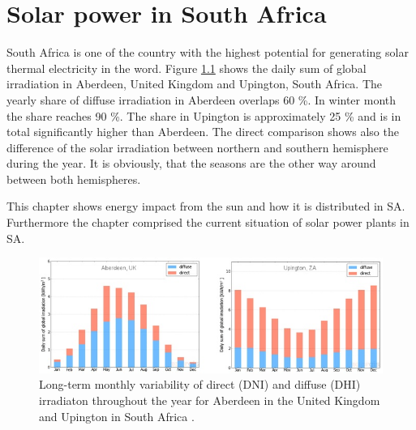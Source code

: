 \chapter{Solar power in South Africa}\label{Solar power in South Africa}
South Africa is one of the country with the highest potential for generating solar thermal electricity in the word. Figure \ref{DHI-DIF} shows  the daily sum of global irradiation in Aberdeen, United Kingdom and Upington, South Africa. The yearly share of diffuse irradiation in Aberdeen overlaps 60 \%. In winter month the share reaches 90 \%. The share in Upington is approximately 25 \% and is in total significantly higher than Aberdeen. The direct comparison shows also the difference of the solar irradiation between northern and southern hemisphere during the year. It is obviously, that the seasons are the other way around between both hemispheres.



This chapter shows energy impact from the sun and how it is distributed in SA. Furthermore the chapter comprised the current situation of solar power plants in SA.
\begin{figure}[h!] %
\centering
\includegraphics[width=1\linewidth]{FIG/DHI-DIF}
\caption[Long-term monthly variability of direct (DNI) and diffuse (DHI) irradiaton throughout the year for Aberdeen in the United Kingdom and Upington in South Africa.]{Long-term monthly variability of direct (DNI) and diffuse (DHI) irradiaton throughout the year for Aberdeen in the United Kingdom and Upington in South Africa \cite{SolarGIS2015}.}\label{DHI-DIF}
\end{figure} 
